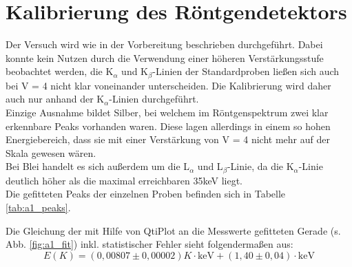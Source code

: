 


\section{Kalibrierung des Röntgendetektors}

Der Versuch wird wie in der Vorbereitung beschrieben durchgeführt.
Dabei konnte kein Nutzen durch die Verwendung einer höheren Verstärkungsstufe beobachtet werden, die K$_\alpha$ und K$_\beta$-Linien der Standardproben ließen sich auch bei V = 4 nicht klar voneinander unterscheiden. Die Kalibrierung wird daher auch nur anhand der K$_\alpha$-Linien durchgeführt.\\
Einzige Ausnahme bildet Silber, bei welchem im Röntgenspektrum zwei klar erkennbare Peaks vorhanden waren. Diese lagen allerdings in einem so hohen Energiebereich, dass sie mit einer Verstärkung von V = 4 nicht mehr auf der Skala gewesen wären.\\
Bei Blei handelt es sich außerdem um die L$_\alpha$ und L$_\beta$-Linie, da die K$_\alpha$-Linie deutlich höher als die maximal erreichbaren 35\;keV liegt.\\
Die gefitteten Peaks der einzelnen Proben befinden sich in Tabelle \ref{tab:a1_peaks}.


Die Gleichung der mit Hilfe von QtiPlot an die Messwerte gefitteten Gerade (s. Abb. \ref{fig:a1_fit}) inkl. statistischer Fehler sieht folgendermaßen aus:
\begin{equation}
	E(K) = (0,00807\pm 0,00002)K\cdot\si{\kilo\electronvolt} + (1,40\pm 0,04)\cdot\si{\kilo\electronvolt}
\end{equation}

